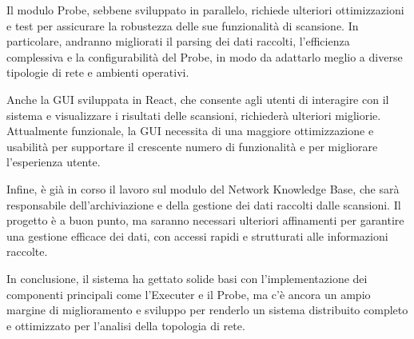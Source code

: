 \documentclass[target=bach,aauheader=,style=]{thud}
\begin{document}
Il modulo Probe, sebbene sviluppato in parallelo, richiede ulteriori ottimizzazioni e test per assicurare la robustezza delle sue funzionalità di scansione. In particolare, andranno migliorati il parsing dei dati raccolti, l’efficienza complessiva e la configurabilità del Probe, in modo da adattarlo meglio a diverse tipologie di rete e ambienti operativi.


Anche la GUI sviluppata in React, che consente agli utenti di interagire con il sistema e visualizzare i risultati delle scansioni, richiederà ulteriori migliorie. Attualmente funzionale, la GUI necessita di una maggiore ottimizzazione e usabilità per supportare il crescente numero di funzionalità e per migliorare l'esperienza utente.


Infine, è già in corso il lavoro sul modulo del Network Knowledge Base, che sarà responsabile dell’archiviazione e della gestione dei dati raccolti dalle scansioni. Il progetto è a buon punto, ma saranno necessari ulteriori affinamenti per garantire una gestione efficace dei dati, con accessi rapidi e strutturati alle informazioni raccolte.


In conclusione, il sistema ha gettato solide basi con l’implementazione dei componenti principali come l'Executer e il Probe, ma c'è ancora un ampio margine di miglioramento e sviluppo per renderlo un sistema distribuito completo e ottimizzato per l’analisi della topologia di rete.




\backmatter
\end{document}
